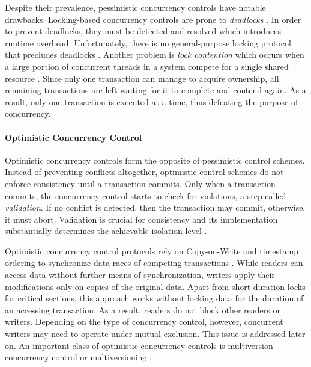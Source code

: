 Despite their prevalence, pessimistic concurrency controls have notable
drawbacks. Locking-based concurrency controls are prone to \emph{deadlocks}
\cite{bernstein1981concurrency, kung1981optimistic}. In order to prevent
deadlocks, they must be detected and resolved which introduces runtime overhead.
Unfortunately, there is no general-purpose locking protocol that precludes
deadlocks \cite{kung1981optimistic}. Another problem is \emph{lock contention}
which occurs when a large portion of concurrent threads in a system compete for
a single shared resource \cite{berenson1995critique, sadoghi2014reducing}. Since
only one transaction can manage to acquire ownership, all remaining transactions
are left waiting for it to complete and contend again. As a result, only one
transaction is executed at a time, thus defeating the purpose of concurrency.

\paragraph{Optimistic Concurrency Control}

Optimistic concurrency controls form the opposite of pessimistic control
schemes. Instead of preventing conflicts altogether, optimistic control schemes
do not enforce consistency until a transaction commits. Only when a transaction
commits, the concurrency control starts to check for violations, a step called
\emph{validation}. If no conflict is detected, then the transaction may commit,
otherwise, it must abort. Validation is crucial for consistency and its
implementation substantially determines the achievable isolation level
\cite{larson2011high}.

Optimistic concurrency control protocols rely on Copy-on-Write and timestamp
ordering to synchronize data races of competing transactions
\cite{bernstein1981concurrency, kung1981optimistic}. While readers can access
data without further means of synchronization, writers apply their modifications
only on copies of the original data. Apart from short-duration locks for
critical sections, this approach works without locking data for the duration of
an accessing transaction. As a result, readers do not block other readers or
writers. Depending on the type of concurrency control, however, concurrent
writers may need to operate under mutual exclusion. This issue is addressed
later on. An important class of optimistic concurrency controls is multiversion
concurrency control or multiversioning \cite{reed1978naming,
bernstein1983multiversion}.

